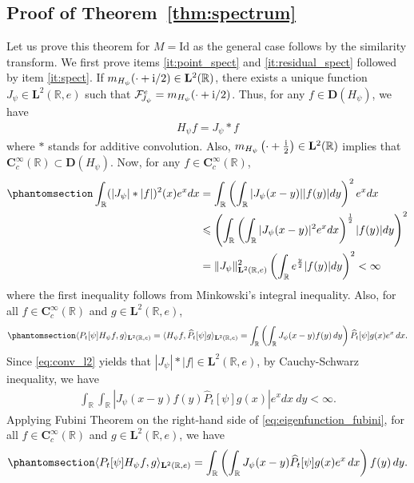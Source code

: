 \documentclass[12pt]{amsart}
\newcommand{\hlabel}{\phantomsection\label}
\numberwithin{equation}{section}
\newcommand{\bb}{\mathbb}
\newcommand{\cc}{\mathcal}
\renewcommand{\le}{\leqslant}
\newcommand{\bmrm}[2][2]{\mathbf{#2}^{#1}}
\newcommand{\Jp}{J_{\psi}}
\newcommand{\Hpsi}{H_\psi}
\newcommand{\fouho}{\cc{F}^{e}}
\newcommand{\C}{\mathbf{C}}
\newcommand{\D}{\mathbf{D}}
\renewcommand{\i}{\mathrm{i}}
\theoremstyle{definition}
\theoremstyle{assump}
\theoremstyle{remark}
\begin{document}
{\subsection{Proof of Theorem~\ref{thm:spectrum}}\hlabel{sec:proof4} Let us prove this theorem for $M=\mathrm{Id}$ as the general case  follows by the similarity transform. We first prove items \eqref{it:point_spect} and \eqref{it:residual_spect} followed by item \eqref{it:spect}. If $m_{\Hpsi}(\cdot+{\rm{i}}/2)\in\bmrm{L}(\bb{R})$, there exists a unique function $\Jp\in\bmrm{L}(\bb{R},e)$ such that $\fouho_{\!\Jp}=m_{\Hpsi}(\cdot+{\rm{i}}/2)$. Thus, for any $f\in\D(\Hpsi)$, we have
\begin{align}
\Hpsi f=\Jp\ast f \nonumber
\end{align}
where $\ast$ stands for additive convolution. Also, $m_{\Hpsi}\left(\cdot+{\i \over 2}\right)\in\bmrm{L}(\bb{R})$ implies that $\C^\infty_c(\bb{R})\subset\D(\Hpsi)$. Now, for any $ f \in \C^\infty_c(\bb{R})$,
\begin{align}\hlabel{eq:conv_l2}
\int_\bb{R} (|\Jp|\ast| f |)^2 (x) e^x dx &=\int_\bb{R}\left(\int_\bb{R}|\Jp(x-y)|| f (y)| dy\right)^2 e^x dx \\ &\le\left(\int_\bb{R}\left(\int_\bb{R}|\Jp(x-y)|^2 e^x dx\right)^{\frac{1}{2}}| f (y)| dy\right)^2 \nonumber \\
&=\|\Jp\|^2_{\bmrm{L}(\bb{R},e)}\left(\int_\bb{R} e^{\frac{y}{2}}| f (y)|dy\right)^2<\infty \nonumber
\end{align}
where the first inequality follows from Minkowski's integral inequality. Also, for all $ f \in \C^\infty_c(\bb{R})$ and $g\in\bmrm{L}(\bb{R},e)$,
\begin{align}\hlabel{eq:eigenfunction_fubini}
\langle P_t[\psi]\Hpsi f , g\rangle_{\bmrm{L}(\bb{R},e)}=\langle\Hpsi f , \widehat{P}_t[\psi] g\rangle_{\bmrm{L}(\bb{R},e)}=\int_{\bb{R}}\left(\int_{\bb{R}}\Jp(x-y) f (y)\,dy\right)\widehat{P}_t[\psi]g(x)e^x\,dx.
\end{align}
Since \eqref{eq:conv_l2} yields that $|\Jp|\ast| f |\in\bmrm{L}(\bb{R},e)$, by Cauchy-Schwarz inequality, we have
\begin{align*}
\int_\bb{R}\int_\bb{R}|\Jp (x-y) f (y)\widehat{P}_t[\psi] g(x)| e^x dx\ dy <\infty.
\end{align*}
Applying Fubini Theorem  on the right-hand side of \eqref{eq:eigenfunction_fubini}, for all $ f \in \C^\infty_c(\bb{R})$ and $g\in\bmrm{L}(\bb{R},e)$, we have
\begin{align}\hlabel{spectral_lhs}
\langle P_t[\psi]\Hpsi  f , g\rangle_{\bmrm{L}(\bb{R},e)}=\int_{\bb{R}}\left(\int_{\bb{R}}\Jp(x-y)\widehat{P}_t[\psi]g(x) e^x\,dx\right)  f (y)\,dy.

\end{align}}
\end{document}

